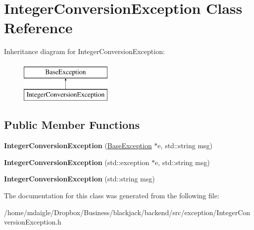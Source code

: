 \hypertarget{classIntegerConversionException}{
\section{\-Integer\-Conversion\-Exception \-Class \-Reference}
\label{classIntegerConversionException}
}
\-Inheritance diagram for \-Integer\-Conversion\-Exception\-:\begin{figure}[H]
\begin{center}
\leavevmode
\includegraphics[height=2.000000cm]{classIntegerConversionException}
\end{center}
\end{figure}
\subsection*{\-Public \-Member \-Functions}
\begin{DoxyCompactItemize}
\item 
\hypertarget{classIntegerConversionException_aa4c051dc648b6728e17841432596b081}{
{\bfseries \-Integer\-Conversion\-Exception} (\hyperlink{classBaseException}{\-Base\-Exception} $\ast$e, std\-::string msg)}
\label{classIntegerConversionException_aa4c051dc648b6728e17841432596b081}

\item 
\hypertarget{classIntegerConversionException_ad35d2d51c3808e79e61ef9afb818c667}{
{\bfseries \-Integer\-Conversion\-Exception} (std\-::exception $\ast$e, std\-::string msg)}
\label{classIntegerConversionException_ad35d2d51c3808e79e61ef9afb818c667}

\item 
\hypertarget{classIntegerConversionException_aa6be7fa941c0ebdd3354ceabcf3e8f94}{
{\bfseries \-Integer\-Conversion\-Exception} (std\-::string msg)}
\label{classIntegerConversionException_aa6be7fa941c0ebdd3354ceabcf3e8f94}

\end{DoxyCompactItemize}


\-The documentation for this class was generated from the following file\-:\begin{DoxyCompactItemize}
\item 
/home/mdaigle/\-Dropbox/\-Business/blackjack/backend/src/exception/\-Integer\-Conversion\-Exception.\-h\end{DoxyCompactItemize}
